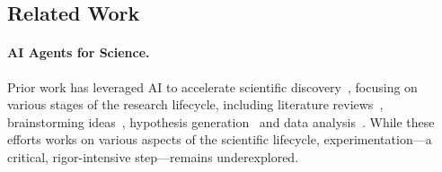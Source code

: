 \fi

\subsection{Related Work}
\label{subsec:related-work}



\paragraph{AI Agents for Science.}
Prior work has leveraged AI to accelerate scientific discovery~\cite{berens2023aiscienceemergingagenda, Kitano2021}, focusing on various stages of the research lifecycle, including literature reviews~\cite{agarwal2024litllm, paper-review1}, brainstorming ideas~\cite{gu2024generation, bran2024knowledge}, hypothesis generation~\cite{sourati2023accelerating, hypothesis1, hypothesis2, hypothesis3} and data analysis~\cite{hong2024data, chen2024scienceagentbench}.
While these efforts works on various aspects of the scientific lifecycle, experimentation—a critical, rigor-intensive step—remains underexplored.

